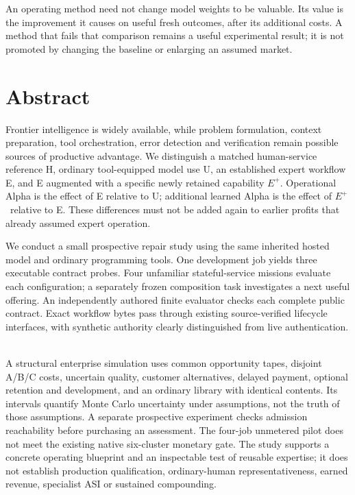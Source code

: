 \documentclass[11pt,letterpaper]{article}
\newcommand{\Eplus}{\ensuremath{E^{+}}}
\begin{document}
\vfill
{\small\color{Ink}An operating method need not change model weights to be valuable. Its value is the improvement it causes on useful fresh outcomes, after its additional costs. A method that fails that comparison remains a useful experimental result; it is not promoted by changing the baseline or enlarging an assumed market.}
\newpage

\section*{Abstract}
Frontier intelligence is widely available, while problem formulation, context preparation, tool orchestration, error detection and verification remain possible sources of productive advantage. We distinguish a matched human-service reference H, ordinary tool-equipped model use U, an established expert workflow E, and E augmented with a specific newly retained capability \Eplus. Operational Alpha is the effect of E relative to U; additional learned Alpha is the effect of \Eplus\ relative to E. These differences must not be added again to earlier profits that already assumed expert operation.

We conduct a small prospective repair study using the same inherited hosted model and ordinary programming tools. One development job yields three executable contract probes. Four unfamiliar stateful-service missions evaluate each configuration; a separately frozen composition task investigates a next useful offering. An independently authored finite evaluator checks each complete public contract. Exact workflow bytes pass through existing source-verified lifecycle interfaces, with synthetic authority clearly distinguished from live authentication. \PilotFinding\ \CompositionFinding

A structural enterprise simulation uses common opportunity tapes, disjoint A/B/C costs, uncertain quality, customer alternatives, delayed payment, optional retention and development, and an ordinary library with identical contents. Its intervals quantify Monte Carlo uncertainty under assumptions, not the truth of those assumptions. A separate prospective experiment checks admission reachability before purchasing an assessment. The four-job unmetered pilot does not meet the existing native six-cluster monetary gate. The study supports a concrete operating blueprint and an inspectable test of reusable expertise; it does not establish production qualification, ordinary-human representativeness, earned revenue, specialist ASI or sustained compounding.
\end{document}
